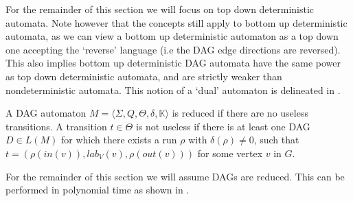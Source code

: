 \documentclass[11pt]{article}
\begin{document}
For the remainder of this section we will focus on top down deterministic
automata. Note however that the concepts still apply to bottom up deterministic
automata, as we can view a bottom up deterministic automaton as a top down one
accepting the `reverse' language (i.e the DAG edge directions are reversed).
This also implies bottom up deterministic DAG automata have the same power as
top down deterministic automata, and are strictly weaker than nondeterministic
automata. This notion of a `dual' automaton is delineated in
\cite{blum2019properties}. 

\begin{definition}\label{def:reducedautomaton}

  A DAG automaton $M =  \langle \Sigma, Q, \Theta, \delta, \mathbb{K}\rangle$ is
  reduced if there are no useless transitions. A transition $t \in \Theta$ is
  not useless if there is at least one DAG $D \in L(M)$ for which there exists a
  run $\rho$ with $\delta(\rho) \ne 0$, such that $t = (\rho(in(v)), lab_V(v),
  \rho(out(v)))$ for some vertex $v$ in $G$. 
\end{definition}

For the remainder of this section we will assume DAGs are reduced. This can be
performed in polynomial time as shown in \cite{blum2019properties}.
\end{document}
